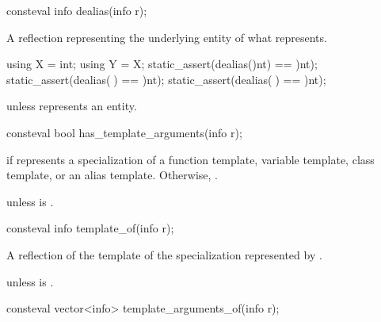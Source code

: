 %
\begin{itemdecl}
consteval info dealias(info r);
\end{itemdecl}

\begin{itemdescr}
\pnum
\returns
A reflection representing the underlying entity of what  represents.
\begin{example}
\begin{codeblock}
using X = int;
using Y = X;
static_assert(dealias(^^int) == ^^int);
static_assert(dealias(^^X) == ^^int);
static_assert(dealias(^^Y) == ^^int);
\end{codeblock}
\end{example}

\pnum
\throws
{} unless
 represents an entity.
\end{itemdescr}

%
\begin{itemdecl}
consteval bool has_template_arguments(info r);
\end{itemdecl}

\begin{itemdescr}
\pnum
\returns
{} if  represents a specialization of a
function template,
variable template,
class template, or
an alias template.
Otherwise, .

\pnum
\throws
{} unless
 is .
\end{itemdescr}

%
\begin{itemdecl}
consteval info template_of(info r);
\end{itemdecl}

\begin{itemdescr}
\pnum
\returns
A reflection of the template of the specialization represented by .

\pnum
\throws
{} unless
 is .
\end{itemdescr}

%
\begin{itemdecl}
consteval vector<info> template_arguments_of(info r);
\end{itemdecl}

